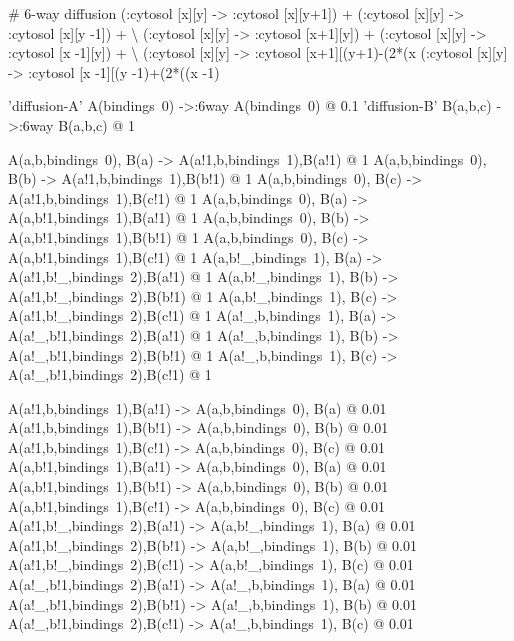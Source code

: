 \begin{kappasource}


# 6-way diffusion
    (:cytosol [x][y] -> :cytosol [x][y+1]) + (:cytosol [x][y] -> :cytosol [x][y -1]) + {\textbackslash}
    (:cytosol [x][y] -> :cytosol [x+1][y]) + (:cytosol [x][y] -> :cytosol [x -1][y]) + {\textbackslash}
    (:cytosol [x][y] -> :cytosol [x+1][(y+1)-(2*(x%
    (:cytosol [x][y] -> :cytosol [x -1][(y -1)+(2*((x -1)%

'diffusion-A' A(bindings~0) ->:6way A(bindings~0) @ 0.1 
'diffusion-B' B(a,b,c) ->:6way B(a,b,c) @ 1 

A(a,b,bindings~0), B(a) -> A(a!1,b,bindings~1),B(a!1) @ 1
A(a,b,bindings~0), B(b) -> A(a!1,b,bindings~1),B(b!1) @ 1
A(a,b,bindings~0), B(c) -> A(a!1,b,bindings~1),B(c!1) @ 1
A(a,b,bindings~0), B(a) -> A(a,b!1,bindings~1),B(a!1) @ 1
A(a,b,bindings~0), B(b) -> A(a,b!1,bindings~1),B(b!1) @ 1
A(a,b,bindings~0), B(c) -> A(a,b!1,bindings~1),B(c!1) @ 1
A(a,b!_,bindings~1), B(a) -> A(a!1,b!_,bindings~2),B(a!1) @ 1
A(a,b!_,bindings~1), B(b) -> A(a!1,b!_,bindings~2),B(b!1) @ 1
A(a,b!_,bindings~1), B(c) -> A(a!1,b!_,bindings~2),B(c!1) @ 1
A(a!_,b,bindings~1), B(a) -> A(a!_,b!1,bindings~2),B(a!1) @ 1
A(a!_,b,bindings~1), B(b) -> A(a!_,b!1,bindings~2),B(b!1) @ 1
A(a!_,b,bindings~1), B(c) -> A(a!_,b!1,bindings~2),B(c!1) @ 1

A(a!1,b,bindings~1),B(a!1) -> A(a,b,bindings~0), B(a) @ 0.01
A(a!1,b,bindings~1),B(b!1) -> A(a,b,bindings~0), B(b) @ 0.01
A(a!1,b,bindings~1),B(c!1) -> A(a,b,bindings~0), B(c) @ 0.01
A(a,b!1,bindings~1),B(a!1) -> A(a,b,bindings~0), B(a) @ 0.01
A(a,b!1,bindings~1),B(b!1) -> A(a,b,bindings~0), B(b) @ 0.01
A(a,b!1,bindings~1),B(c!1) -> A(a,b,bindings~0), B(c) @ 0.01
A(a!1,b!_,bindings~2),B(a!1) -> A(a,b!_,bindings~1), B(a) @ 0.01
A(a!1,b!_,bindings~2),B(b!1) -> A(a,b!_,bindings~1), B(b) @ 0.01
A(a!1,b!_,bindings~2),B(c!1) -> A(a,b!_,bindings~1), B(c) @ 0.01
A(a!_,b!1,bindings~2),B(a!1) -> A(a!_,b,bindings~1), B(a) @ 0.01
A(a!_,b!1,bindings~2),B(b!1) -> A(a!_,b,bindings~1), B(b) @ 0.01
A(a!_,b!1,bindings~2),B(c!1) -> A(a!_,b,bindings~1), B(c) @ 0.01


\end{kappasource}

